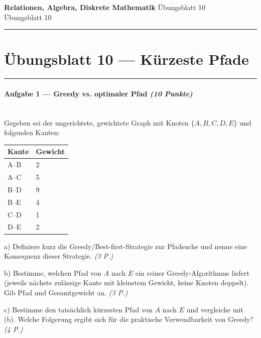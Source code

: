 \documentclass[11pt, a4paper]{article}
\providecommand{\nichttitle}{Übungsblatt}
\providecommand{\nichtsubtitle}{}
\renewcommand{\nichttitle}{Relationen, Algebra, Diskrete Mathematik}
\renewcommand{\nichtsubtitle}{Übungsblatt 10}
\begin{document}
\begin{center}
{\Large\bfseries\color{accent}\nichttitle}
\ifx\nichtsubtitle\empty\else
  \\[2pt]{\normalsize\color{accent!80!black}\nichtsubtitle}
\fi
\\[2pt]
\color{accent}\rule{0.4\linewidth}{0.8pt}\color{black}
\end{center}
\vspace{4pt}


\section{Übungsblatt 10 — Kürzeste Pfade}


\noindent\textcolor{rulegray}{\rule{\linewidth}{0.4pt}}


\paragraph{Aufgabe 1 — Greedy vs. optimaler Pfad \textit{(10 Punkte)}}\mbox{}\\[2pt]

Gegeben sei der ungerichtete, gewichtete Graph mit Knoten $\{A, B, C, D, E\}$ und folgenden Kanten:



{\small
\begin{tabularx}{\linewidth}{XX}
\hline
\rowcolor{tableheadbg}
{\color{white}\textbf{Kante}} & {\color{white}\textbf{Gewicht}} \\[2pt]
\hline
\endhead
\hline
\endfoot
A–B & 2 \\
A–C & 5 \\
B–D & 9 \\
B–E & 4 \\
C–D & 1 \\
D–E & 2 \\
\end{tabularx}
}


a) Definiere kurz die Greedy/Best-first-Strategie zur Pfadsuche und nenne eine Konsequenz dieser Strategie. \textit{(3 P.)}


b) Bestimme, welchen Pfad von $A$ nach $E$ ein reiner Greedy-Algorithmus liefert (jeweils nächste zulässige Kante mit kleinstem Gewicht, keine Knoten doppelt). Gib Pfad und Gesamtgewicht an. \textit{(3 P.)}


c) Bestimme den tatsächlich kürzesten Pfad von $A$ nach $E$ und vergleiche mit (b). Welche Folgerung ergibt sich für die praktische Verwendbarkeit von Greedy? \textit{(4 P.)}
\end{document}
